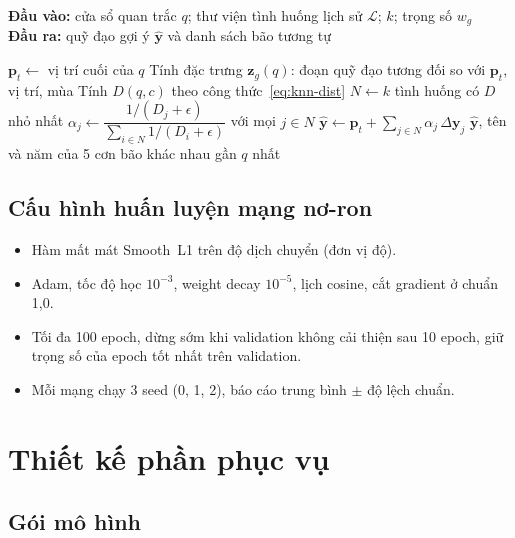 \begin{algorithm}[H]
\caption{Gợi ý đường đi bằng k-NN analog}
\label{alg:knn}
\hspace*{\algorithmicindent}\textbf{Đầu vào:} cửa sổ quan trắc $q$; thư viện tình huống lịch sử $\mathcal{L}$; $k$; trọng số $w_g$\\
\hspace*{\algorithmicindent}\textbf{Đầu ra:} quỹ đạo gợi ý $\hat{\mathbf{y}}$ và danh sách bão tương tự
\begin{algorithmic}[1]
  \State $\mathbf{p}_t \gets$ vị trí cuối của $q$
  \State Tính đặc trưng $\mathbf{z}_g(q)$: đoạn quỹ đạo tương đối so với $\mathbf{p}_t$, vị trí, mùa
    \State Tính $D(q,c)$ theo công thức~\eqref{eq:knn-dist}
  \EndFor
  \State $N \gets k$ tình huống có $D$ nhỏ nhất
  \State $\alpha_j \gets \dfrac{1/(D_j+\epsilon)}{\sum_{i \in N} 1/(D_i+\epsilon)}$ với mọi $j \in N$
  \State $\hat{\mathbf{y}} \gets \mathbf{p}_t + \sum_{j \in N} \alpha_j \, \Delta\mathbf{y}_j$
  \State \Return $\hat{\mathbf{y}}$, tên và năm của 5 cơn bão khác nhau gần $q$ nhất
\EndFunction
\end{algorithmic}
\end{algorithm}

\subsection{Cấu hình huấn luyện mạng nơ-ron}

\begin{itemize}[leftmargin=1.6em, itemsep=2pt]
  \item Hàm mất mát Smooth~L1 trên độ dịch chuyển (đơn vị độ).
  \item Adam, tốc độ học $10^{-3}$, weight decay $10^{-5}$, lịch cosine,
        cắt gradient ở chuẩn 1,0.
  \item Tối đa 100 epoch, dừng sớm khi validation không cải thiện sau 10 epoch,
        giữ trọng số của epoch tốt nhất trên validation.
  \item Mỗi mạng chạy 3 seed (0, 1, 2), báo cáo trung bình $\pm$ độ lệch chuẩn.
\end{itemize}

\section{Thiết kế phần phục vụ}

\subsection{Gói mô hình}

